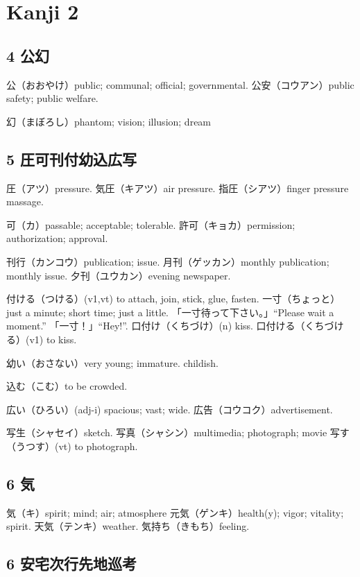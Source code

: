 \chapter{Kanji 2}

\section{4 公幻}

公（おおやけ）public; communal; official; governmental.
公安（コウアン）public safety; public welfare.

幻（まぼろし）phantom; vision; illusion; dream

\section{5 圧可刊付幼込広写}

圧（アツ）pressure.
気圧（キアツ）air pressure.
指圧（シアツ）finger pressure massage.

可（カ）passable; acceptable; tolerable.
許可（キョカ）permission; authorization; approval.

刊行（カンコウ）publication; issue.
月刊（ゲッカン）monthly publication; monthly issue.
夕刊（ユウカン）evening newspaper.

付ける（つける）(v1,vt) to attach, join, stick, glue, fasten.
一寸（ちょっと）just a minute; short time; just a little.
「一寸待って下さい。」``Please wait a moment.''
「一寸！」``Hey!''.
口付け（くちづけ）(n) kiss.
口付ける（くちづける）(v1) to kiss.

幼い（おさない）very young; immature. childish.

込む（こむ）to be crowded.

広い（ひろい）(adj-i) spacious; vast; wide.
広告（コウコク）advertisement.

写生（シャセイ）sketch.
写真（シャシン）multimedia; photograph; movie
写す（うつす）(vt) to photograph.

\section{6 気}

気（キ）spirit; mind; air; atmosphere
元気（ゲンキ）health(y); vigor; vitality; spirit.
天気（テンキ）weather.
気持ち（きもち）feeling.

\section{6 安宅次行先地巡考}

